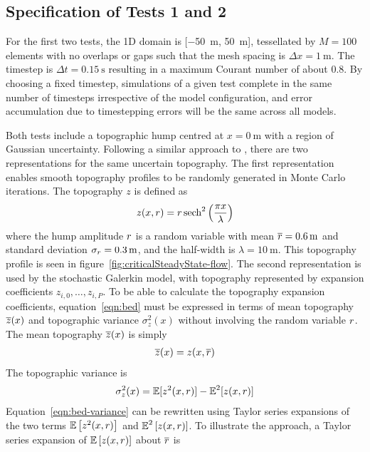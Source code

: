 \subsection{Specification of Tests 1 and 2}
For the first two tests, the 1D domain is [\SI{-50}{\meter}, \SI{50}{\meter}], tessellated by $M = 100$ elements with no overlaps or gaps such that the mesh spacing is $\Delta x = \SI{1}{\meter}$.
The timestep is $\Delta t = \SI{0.15}{\second}$ resulting in a maximum Courant number of about $0.8$.
By choosing a fixed timestep, simulations of a given test complete in the same number of timesteps irrespective of the model configuration, and error accumulation due to timestepping errors will be the same across all models.

Both tests include a topographic hump centred at $x = \SI{0}{\meter}$ with a region of Gaussian uncertainty.
Following a similar approach to \citet{ge2008}, there are two representations for the same uncertain topography.
The first representation enables smooth topography profiles to be randomly generated in Monte Carlo iterations.
The topography $z$ is defined as
\begin{align}
z(x, r) = r \operatorname{sech}^2 \left( \frac{\pi x}{\lambda} \right) \label{eqn:bed}
\end{align}
where the hump amplitude $r$ is a random variable with mean $\overline{r} = \SI{0.6}{\meter}$ and standard deviation $\sigma_r = \SI{0.3}{\meter}$, and the half-width is $\lambda = \SI{10}{\meter}$.
This topography profile is seen in figure~\ref{fig:criticalSteadyState-flow}.
The second representation is used by the stochastic Galerkin model, with topography represented by expansion coefficients $z_{i,0}, \ldots, z_{i,P}$.
To be able to calculate the topography expansion coefficients, equation~\eqref{eqn:bed} must be expressed in terms of mean topography $\overline{z}(x)$ and topographic variance $\sigma_z^2(x)$ without involving the random variable $r$.
The mean topography $\overline{z}(x)$ is simply
\begin{align}
    \overline{z}(x) = z(x, \overline{r})
    \label{eqn:bed-mean}
\end{align}
The topographic variance is
\begin{align}
    \sigma^2_z(x) = \operatorname{\mathbb{E}}[z^2(x, r)] - \operatorname{\mathbb{E}}^2[z(x, r)]
    \label{eqn:bed-variance}
\end{align}
Equation~\eqref{eqn:bed-variance} can be rewritten using Taylor series expansions of the two terms $\operatorname{\mathbb{E}}\left[z^2(x, r)\right]$ and $\operatorname{\mathbb{E}}^2\left[z(x, r)\right]$.
To illustrate the approach, a Taylor series expansion of $\operatorname{\mathbb{E}}\left[ z(x, r) \right]$ about $\overline{r}$ is 
